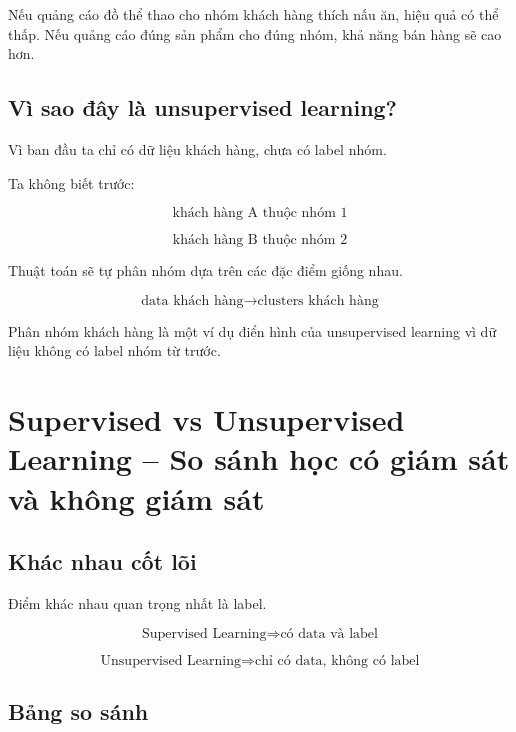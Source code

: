 \begin{vidu}
Nếu quảng cáo đồ thể thao cho nhóm khách hàng thích nấu ăn, hiệu quả có thể thấp. Nếu quảng cáo đúng sản phẩm cho đúng nhóm, khả năng bán hàng sẽ cao hơn.
\end{vidu}

\subsection{Vì sao đây là unsupervised learning?}

Vì ban đầu ta chỉ có dữ liệu khách hàng, chưa có label nhóm.

Ta không biết trước:

\[
    \text{khách hàng A thuộc nhóm 1}
\]

\[
    \text{khách hàng B thuộc nhóm 2}
\]

Thuật toán sẽ tự phân nhóm dựa trên các đặc điểm giống nhau.

\[
    \text{data khách hàng}
    \rightarrow
    \text{clusters khách hàng}
\]

\begin{ghinho}
Phân nhóm khách hàng là một ví dụ điển hình của unsupervised learning vì dữ liệu không có label nhóm từ trước.
\end{ghinho}

\section{Supervised vs Unsupervised Learning -- So sánh học có giám sát và không giám sát}

\subsection{Khác nhau cốt lõi}

Điểm khác nhau quan trọng nhất là label.

\[
    \text{Supervised Learning}
    \Rightarrow
    \text{có data và label}
\]

\[
    \text{Unsupervised Learning}
    \Rightarrow
    \text{chỉ có data, không có label}
\]

\subsection{Bảng so sánh}

